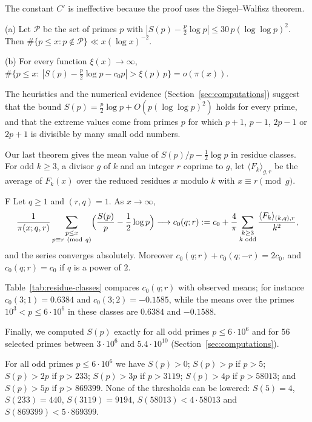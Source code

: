 The constant $C'$ is ineffective because the proof uses the Siegel--Walfisz theorem.

\begin{corollary}\label{cor:density}
\textup{(a)} Let $\mathcal P$ be the set of primes $p$ with $|S(p)-\frac p2\log p|\le30\,p(\log\log p)^2$. Then $\#\{p\le x:p\notin\mathcal P\}\ll x(\log x)^{-2}$.

\textup{(b)} For every function $\xi(x)\to\infty$, $\#\{p\le x:\ |S(p)-\frac p2\log p-c_0p|>\xi(p)\,p\}=o(\pi(x))$.
\end{corollary}

The heuristics and the numerical evidence (Section~\ref{sec:computations}) suggest that the bound $S(p)=\frac p2\log p+O(p(\log\log p)^2)$ holds for every prime, and that the extreme values come from primes $p$ for which $p+1$, $p-1$, $2p-1$ or $2p+1$ is divisible by many small odd numbers.

Our last theorem gives the mean value of $S(p)/p-\frac12\log p$ in residue classes. For odd $k\ge3$, a divisor $g$ of $k$ and an integer $r$ coprime to $g$, let $\langle F_k\rangle_{g,r}$ be the average of $F_k(x)$ over the reduced residues $x$ modulo $k$ with $x\equiv r\pmod g$.

\begin{namedthm}{F}\label{thm:F}
Let $q\ge1$ and $(r,q)=1$. As $x\to\infty$,
\[
\frac1{\pi(x;q,r)}\sum_{\substack{p\le x\\ p\equiv r\ (\mathrm{mod}\ q)}}\Bigl(\frac{S(p)}p-\frac12\log p\Bigr)\longrightarrow c_0(q;r):=c_0+\frac4\pi\sum_{\substack{k\ge3\\ k\text{ odd}}}\frac{\langle F_k\rangle_{(k,q),r}}{k^2},
\]
and the series converges absolutely. Moreover $c_0(q;r)+c_0(q;-r)=2c_0$, and $c_0(q;r)=c_0$ if $q$ is a power of $2$.
\end{namedthm}

Table~\ref{tab:residue-classes} compares $c_0(q;r)$ with observed means; for instance $c_0(3;1)=0.6384$ and $c_0(3;2)=-0.1585$, while the means over the primes $10^3<p\le6\cdot10^6$ in these classes are $0.6384$ and $-0.1588$.

Finally, we computed $S(p)$ exactly for all odd primes $p\le6\cdot10^6$ and for $56$ selected primes between $3\cdot10^6$ and $5.4\cdot10^{10}$ (Section~\ref{sec:computations}).

\begin{proposition}\label{prop:numerics}
For all odd primes $p\le6\cdot10^6$ we have $S(p)>0$; $S(p)>p$ if $p>5$; $S(p)>2p$ if $p>233$; $S(p)>3p$ if $p>3119$; $S(p)>4p$ if $p>58013$; and $S(p)>5p$ if $p>869399$. None of the thresholds can be lowered: $S(5)=4$, $S(233)=440$, $S(3119)=9194$, $S(58013)<4\cdot58013$ and $S(869399)<5\cdot869399$.
\end{proposition}

